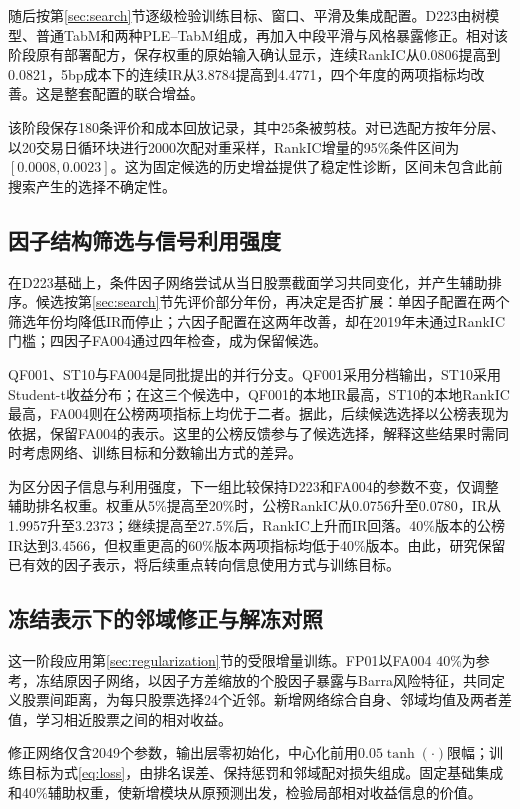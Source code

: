 \documentclass[UTF8,11pt,a4paper,fontset=fandol]{ctexart}
\begin{document}
随后按第\ref{sec:search}节逐级检验训练目标、窗口、平滑及集成配置。D223由树模型、普通TabM和两种PLE--TabM组成，再加入中段平滑与风格暴露修正。相对该阶段原有部署配方，保存权重的原始输入确认显示，连续RankIC从0.0806提高到0.0821，5bp成本下的连续IR从3.8784提高到4.4771，四个年度的两项指标均改善。这是整套配置的联合增益。

该阶段保存180条评价和成本回放记录，其中25条被剪枝。对已选配方按年分层、以20交易日循环块进行2000次配对重采样，RankIC增量的95\%条件区间为$[0.0008,0.0023]$。这为固定候选的历史增益提供了稳定性诊断，区间未包含此前搜索产生的选择不确定性。

\subsection{因子结构筛选与信号利用强度}
在D223基础上，条件因子网络尝试从当日股票截面学习共同变化，并产生辅助排序。候选按第\ref{sec:search}节先评价部分年份，再决定是否扩展：单因子配置在两个筛选年份均降低IR而停止；六因子配置在这两年改善，却在2019年未通过RankIC门槛；四因子FA004通过四年检查，成为保留候选。

QF001、ST10与FA004是同批提出的并行分支。QF001采用分档输出，ST10采用Student-t收益分布；在这三个候选中，QF001的本地IR最高，ST10的本地RankIC最高，FA004则在公榜两项指标上均优于二者。据此，后续候选选择以公榜表现为依据，保留FA004的表示。这里的公榜反馈参与了候选选择，解释这些结果时需同时考虑网络、训练目标和分数输出方式的差异。

为区分因子信息与利用强度，下一组比较保持D223和FA004的参数不变，仅调整辅助排名权重。权重从5\%提高至20\%时，公榜RankIC从0.0756升至0.0780，IR从1.9957升至3.2373；继续提高至27.5\%后，RankIC上升而IR回落。40\%版本的公榜IR达到3.4566，但权重更高的60\%版本两项指标均低于40\%版本。由此，研究保留已有效的因子表示，将后续重点转向信息使用方式与训练目标。

\subsection{冻结表示下的邻域修正与解冻对照}
这一阶段应用第\ref{sec:regularization}节的受限增量训练。FP01以FA004 40\%为参考，冻结原因子网络，以因子方差缩放的个股因子暴露与Barra风险特征，共同定义股票间距离，为每只股票选择24个近邻。新增网络综合自身、邻域均值及两者差值，学习相近股票之间的相对收益。

修正网络仅含2049个参数，输出层零初始化，中心化前用$0.05\tanh(\cdot)$限幅；训练目标为式\eqref{eq:loss}，由排名误差、保持惩罚和邻域配对损失组成。固定基础集成和40\%辅助权重，使新增模块从原预测出发，检验局部相对收益信息的价值。
\end{document}
